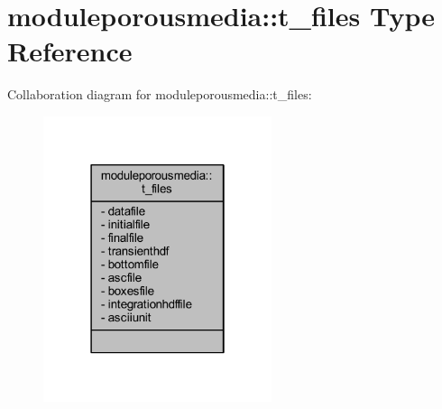 \hypertarget{structmoduleporousmedia_1_1t__files}{}\section{moduleporousmedia\+:\+:t\+\_\+files Type Reference}
\label{structmoduleporousmedia_1_1t__files}


Collaboration diagram for moduleporousmedia\+:\+:t\+\_\+files\+:\nopagebreak
\begin{figure}[H]
\begin{center}
\leavevmode
\includegraphics[width=190pt]{structmoduleporousmedia_1_1t__files__coll__graph}
\end{center}
\end{figure}
